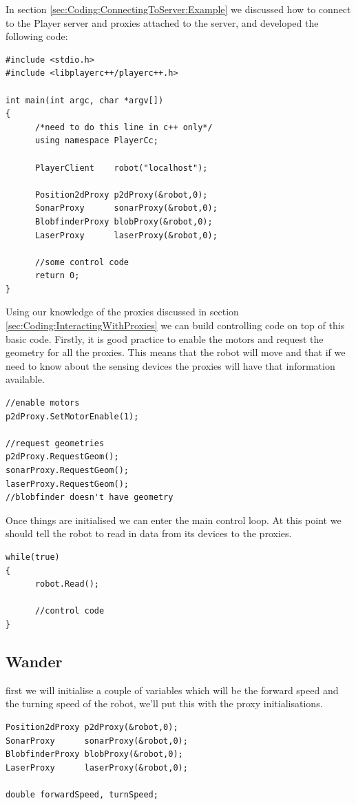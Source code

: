 \documentclass[a4paper]{report}
\newcommand{\pl}{Player\xspace}
\begin{document}
In section \ref{sec:Coding:ConnectingToServer:Example} we discussed how to connect to the \pl server and proxies attached to the server, and developed the following code:
\begin{verbatim}
#include <stdio.h>
#include <libplayerc++/playerc++.h>

int main(int argc, char *argv[])
{
      /*need to do this line in c++ only*/
      using namespace PlayerCc;
	
      PlayerClient    robot("localhost");

      Position2dProxy p2dProxy(&robot,0);
      SonarProxy      sonarProxy(&robot,0);
      BlobfinderProxy blobProxy(&robot,0);
      LaserProxy      laserProxy(&robot,0);

      //some control code
      return 0;
}
\end{verbatim}
Using our knowledge of the proxies discussed in section \ref{sec:Coding:InteractingWithProxies} we can build controlling code on top of this basic code. 
Firstly, it is good practice to enable the motors and request the geometry for all the proxies. This means that the robot will move and that if we need to know about the sensing devices the proxies will have that information available.
\begin{verbatim}
//enable motors
p2dProxy.SetMotorEnable(1);

//request geometries
p2dProxy.RequestGeom();
sonarProxy.RequestGeom();
laserProxy.RequestGeom();
//blobfinder doesn't have geometry
\end{verbatim}
Once things are initialised we can enter the main control loop. At this point we should tell the robot to read in data from its devices to the proxies.
\begin{verbatim}
while(true)
{
      robot.Read();

      //control code
}
\end{verbatim}

\subsection{Wander}

first we will initialise a couple of variables which will be the forward speed and the turning speed of the robot, we'll put this with the proxy initialisations.
\begin{verbatim}
Position2dProxy p2dProxy(&robot,0);
SonarProxy      sonarProxy(&robot,0);
BlobfinderProxy blobProxy(&robot,0);
LaserProxy      laserProxy(&robot,0);

double forwardSpeed, turnSpeed;
\end{verbatim}
\end{document}
